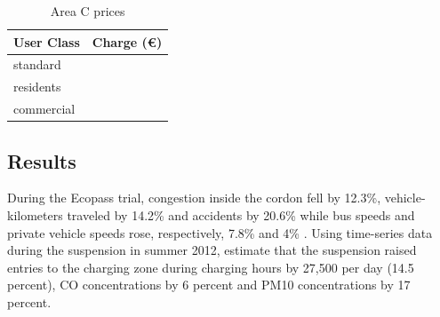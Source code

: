 \begin{table}

\begin{center}
\begin{tabular}{|>{\centering}m{2.2cm}|>{\centering}m{1.8cm}|}
\hline 
User Class & Charge (\euro)\tabularnewline
\hline 
\hline 
standard & 5\tabularnewline
\hline 
residents & 2\tabularnewline
\hline 
commercial & 3\tabularnewline
\hline 
\end{tabular}
\par\end{center}
\caption{Area C prices \citep{Milan2015}}\label{tab:milan-area-c-prices}
\end{table}

\subsection{Results}

During the Ecopass trial, congestion inside the cordon fell by 12.3\%, vehicle-kilometers traveled by 14.2\% and accidents by 20.6\% while bus speeds and private vehicle speeds rose, respectively, 7.8\% and 4\% \citep{Rotaris2010}. Using time-series data during the suspension in summer 2012, \citet{Gibson2015} estimate that the suspension raised entries to the charging zone during charging hours by 27,500 per day (14.5 percent), CO concentrations by 6 percent and PM10 concentrations by 17 percent.
